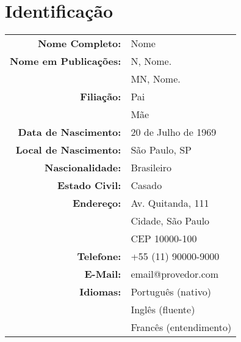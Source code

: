 \chapter{Identificação}

\begin{center}
\begin{tabular}[t]{rl}
\textbf{Nome Completo:}       & Nome\\
\textbf{Nome em Publicações:} & N, Nome.\\
                              & MN, Nome.\\
\textbf{Filiação:}            & Pai\\
                              & Mãe\\
\textbf{Data de Nascimento:}  & 20 de Julho de 1969\\
\textbf{Local de Nascimento:} & São Paulo, SP\\
\textbf{Nascionalidade:}      & Brasileiro\\
\textbf{Estado Civil:}        & Casado\\
\hline
\textbf{Endereço:} & Av. Quitanda, 111\\
                   & Cidade, São Paulo\\
                   & CEP 10000-100\\
\textbf{Telefone:} & +55 (11) 90000-9000\\
\textbf{E-Mail:}   &  email@provedor.com\\
\hline
\textbf{Idiomas:} & Português (nativo)\\
                  & Inglês (fluente)\\
                  & Francês (entendimento)
\end{tabular}
\end{center}